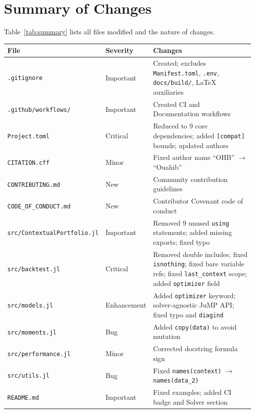 \documentclass[11pt,a4paper]{article}
\begin{document}
\section{Summary of Changes}

Table~\ref{tab:summary} lists all files modified and the nature of changes.

\begin{longtable}{@{}llp{7cm}@{}}
\toprule
\textbf{File} & \textbf{Severity} & \textbf{Changes} \\
\midrule
\endhead
\texttt{.gitignore}               & Important & Created; excludes \texttt{Manifest.toml}, \texttt{.env}, \texttt{docs/build/}, \LaTeX{} auxiliaries \\
\texttt{.github/workflows/}       & Important & Created CI and Documentation workflows \\
\texttt{Project.toml}             & Critical  & Reduced to 9 core dependencies; added \texttt{[compat]} bounds; updated authors \\
\texttt{CITATION.cff}             & Minor     & Fixed author name ``OHB'' $\to$ ``Ouahib'' \\
\texttt{CONTRIBUTING.md}          & New       & Community contribution guidelines \\
\texttt{CODE\_OF\_CONDUCT.md}     & New       & Contributor Covenant code of conduct \\
\texttt{src/ContextualPortfolio.jl} & Important & Removed 9 unused \texttt{using} statements; added missing exports; fixed typo \\
\texttt{src/backtest.jl}          & Critical  & Removed double includes; fixed \texttt{isnothing}; fixed bare variable refs; fixed \texttt{last\_context} scope; added \texttt{optimizer} field \\
\texttt{src/models.jl}            & Enhancement & Added \texttt{optimizer} keyword; solver-agnostic JuMP API; fixed typo and \texttt{diagind} \\
\texttt{src/moments.jl}           & Bug       & Added \texttt{copy(data)} to avoid mutation \\
\texttt{src/performance.jl}       & Minor     & Corrected docstring formula sign \\
\texttt{src/utils.jl}             & Bug       & Fixed \texttt{names(context)} $\to$ \texttt{names(data\_2)} \\
\texttt{README.md}                & Important & Fixed examples; added CI badge and Solver section \\

\end{longtable}
\end{document}
